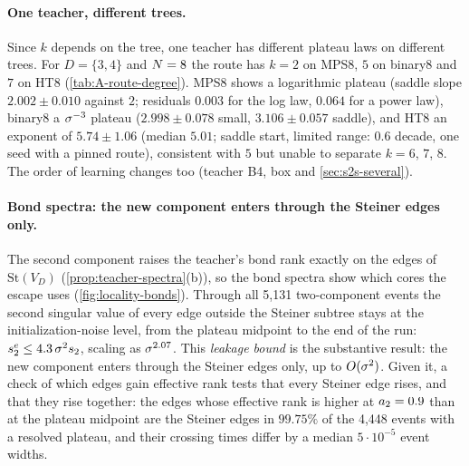 \paragraph{One teacher, different trees.}
\empirical{} Since $k$ depends on the tree, one teacher has different plateau laws on different trees. For
$D=\{3,4\}$ and $N=8$ the route has $k=2$ on MPS8, $5$ on binary8 and $7$ on HT8 (\cref{tab:A-route-degree}).
MPS8 shows a logarithmic plateau (saddle slope $2.002\pm0.010$ against $2$; residuals $0.003$ for the log law,
$0.064$ for a power law), binary8 a $\sigma^{-3}$ plateau ($2.998\pm0.078$ small, $3.106\pm0.057$ saddle), and HT8
an exponent of $5.74\pm1.06$ (median $5.01$; saddle start, limited range: $0.6$ decade, one seed with a pinned route),
consistent with $5$ but unable to separate $k=6$, $7$, $8$. The order of learning changes too (teacher B4, box
and \cref{sec:s2s-several}). \newresult

\paragraph{Bond spectra: the new component enters through the Steiner edges only.}
\empirical{} The second component raises the teacher's bond rank exactly on the edges of $\mathrm{St}(V_D)$
(\cref{prop:teacher-spectra}(b)), so the bond spectra show which cores the escape uses (\cref{fig:locality-bonds}).
Through all 5,131 two-component events the second singular value of every edge outside the Steiner subtree stays at
the initialization-noise level, from the plateau midpoint to the end of the run: $s^{e}_{2}\le4.3\,\sigma^2s_{2}$,
scaling as $\sigma^{2.07}$. This \emph{leakage bound} is the substantive result: the new component enters through
the Steiner edges only, up to $O(\sigma^2)$. Given it, a check of which edges gain effective rank tests that every
Steiner edge rises, and that they rise together: the edges whose effective rank is higher at $a_{2}=0.9$ than at the
plateau midpoint are the Steiner edges in $99.75\%$ of the 4,448 events with a resolved plateau, and their crossing
times differ by a median $5\cdot10^{-5}$ event widths. \newresult


